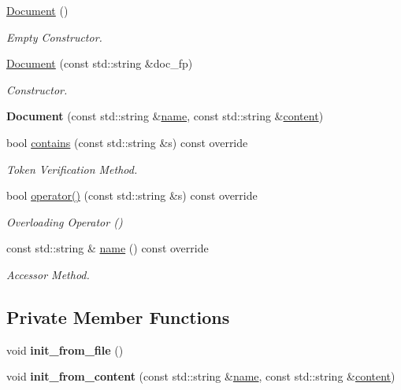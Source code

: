 \begin{DoxyCompactItemize}
\item 
\mbox{\label{class_document_acdbcbe550084e8c20f4f67eb229ad66a}} 
\hyperlink{class_document_acdbcbe550084e8c20f4f67eb229ad66a}{Document} ()
\begin{DoxyCompactList}\small\item\em Empty Constructor. \end{DoxyCompactList}\item 
\hyperlink{class_document_a4399bbc9420b5e5c269e9d38be5d4810}{Document} (const std\+::string \&doc\+\_\+fp)
\begin{DoxyCompactList}\small\item\em Constructor. \end{DoxyCompactList}\item 
\mbox{\label{class_document_a76e11b87c4631a4f2f8a95fd90b5756e}} 
{\bfseries Document} (const std\+::string \&\hyperlink{class_document_a68936706468433f1bbba813797e32bd5}{name}, const std\+::string \&\hyperlink{class_index_item_a2b5b4451bcb2fd50328bdc5b470d6296}{content})
\item 
bool \hyperlink{class_document_a68e12b27c40699cd3c2fff66a6161473}{contains} (const std\+::string \&s) const override
\begin{DoxyCompactList}\small\item\em Token Verification Method. \end{DoxyCompactList}\item 
bool \hyperlink{class_document_a44b8141f08f57f9122b3dba4a59bf7e4}{operator()} (const std\+::string \&s) const override
\begin{DoxyCompactList}\small\item\em Overloading Operator () \end{DoxyCompactList}\item 
const std\+::string \& \hyperlink{class_document_a68936706468433f1bbba813797e32bd5}{name} () const override
\begin{DoxyCompactList}\small\item\em Accessor Method. \end{DoxyCompactList}\end{DoxyCompactItemize}
\subsection*{Private Member Functions}
\begin{DoxyCompactItemize}
\item 
\mbox{\label{class_document_aa5467ea8ec3ac3c819cd9e738a37f2e0}} 
void {\bfseries init\+\_\+from\+\_\+file} ()
\item 
\mbox{\label{class_document_a5db69770f765708861aa53b931ea3dcd}} 
void {\bfseries init\+\_\+from\+\_\+content} (const std\+::string \&\hyperlink{class_document_a68936706468433f1bbba813797e32bd5}{name}, const std\+::string \&\hyperlink{class_index_item_a2b5b4451bcb2fd50328bdc5b470d6296}{content})
\end{DoxyCompactItemize}
